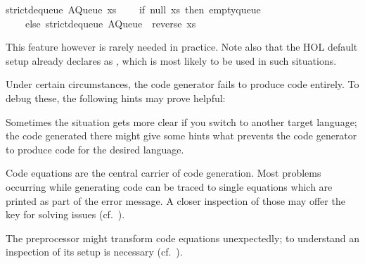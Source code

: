 \begin{isabellebody}
\begin{isamarkuptext}
strict{}dequeue\ {}AQueue\ xs\ {}{}{}\ {}\isanewline
\ \ {}if\ null\ xs\ then\ empty{}queue\isanewline
\ \ \ \ else\ strict{}dequeue\ {}AQueue\ {}{}\ {}reverse\ xs{}{}{}{}\isanewline%
\end{isamarkuptext}%
\isamarkuptrue%
%
\endisatagquotetypewriter
{\isafoldquotetypewriter}%
%
\isadelimquotetypewriter
%
\endisadelimquotetypewriter
%
\begin{isamarkuptext}%
\noindent This feature however is rarely needed in practice.  Note
  also that the HOL default setup already declares 
  as \hyperlink{command.code-abort}{\mbox{}}, which is most likely to be used in such
  situations.%
\end{isamarkuptext}%
\isamarkuptrue%
%
\isamarkuptrue%
%
\begin{isamarkuptext}%
Under certain circumstances, the code generator fails to produce
  code entirely.  To debug these, the following hints may prove
  helpful:

  \begin{description}

      Sometimes
      the situation gets more clear if you switch to another target
      language; the code generated there might give some hints what
      prevents the code generator to produce code for the desired
      language.

      Code equations are the central
      carrier of code generation.  Most problems occurring while generating
      code can be traced to single equations which are printed as part of
      the error message.  A closer inspection of those may offer the key
      for solving issues (cf.~).

      The preprocessor might
      transform code equations unexpectedly; to understand an
      inspection of its setup is necessary (cf.~).


\end{description}
\end{isamarkuptext}
\end{isabellebody}
